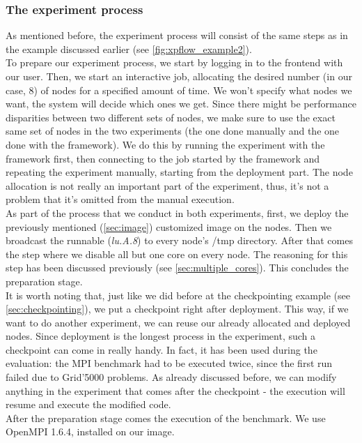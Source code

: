 \subsubsection{The experiment process}
\label{sec:experiment_process}
As mentioned before, the experiment process will consist of the same
steps as in the example discussed earlier
(see \ref{fig:xpflow_example2}).\\[0.3cm]
To prepare our experiment process, we start by
logging in to the frontend with our user. Then, we start an
interactive job, allocating the desired number (in our case, 8) of
nodes for a specified amount of time. We won't specify what nodes we
want, the system will decide which ones we get. Since there might be
performance disparities between two different sets of nodes, we make
sure to use the exact same set of nodes in the two experiments (the
one done manually and the one done with the framework). We do this by
running the experiment with the framework first, then connecting to
the job started by the framework and repeating the experiment
manually, starting from the deployment part. The node allocation is
not really an important part of the experiment, thus, it's not a
problem that it's omitted from the manual execution.\\[0.3cm]
As part of the process that we conduct in both experiments, first, we
deploy the previously mentioned (\ref{sec:image}) customized image on the
nodes. Then we broadcast the runnable (\emph{lu.A.8}) to every node's
/tmp directory. After that comes the step where we disable all but one
core on every node. The reasoning for this step has been discussed
previously (see \ref{sec:multiple_cores}). This concludes the
preparation stage.\\[0.3cm]
It is worth noting that, just like we did before at the
checkpointing example (see \ref{sec:checkpointing}), we put a
checkpoint right after deployment. This way, if we want to do another
experiment, we can reuse our already allocated and deployed
nodes. Since deployment is the longest process in the experiment, such
a checkpoint can come in really handy. In fact, it has been used
during the evaluation: the MPI benchmark had to be executed twice,
since the first run failed due to Grid'5000 problems. As already
discussed before, we
can modify anything in the experiment that comes after the checkpoint
- the execution will resume and execute the modified code.\\[0.3cm]
After the preparation stage comes the execution of the benchmark. We
use OpenMPI 1.6.4, installed on our image.\\[0.3cm]
